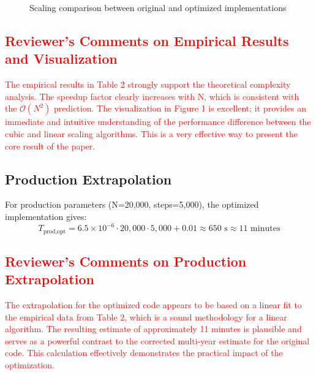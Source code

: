 \documentclass[11pt,a4paper]{article}
\newcommand{\bigO}{\mathcal{O}}
\begin{document}
\begin{figure}[H]
\centering
{}
\caption{Scaling comparison between original and optimized implementations}
\label{fig:scaling}
\end{figure}

\textcolor{red}{
\subsection*{Reviewer's Comments on Empirical Results and Visualization}
The empirical results in Table 2 strongly support the theoretical complexity analysis. The speedup factor clearly increases with N, which is consistent with the $\bigO(N^2)$ prediction. The visualization in Figure 1 is excellent; it provides an immediate and intuitive understanding of the performance difference between the cubic and linear scaling algorithms. This is a very effective way to present the core result of the paper.
}

\subsection{Production Extrapolation}

For production parameters (N=20,000, steps=5,000), the optimized implementation gives:
\begin{equation}
T_{\text{prod,opt}} = 6.5 \times 10^{-6} \cdot 20{,}000 \cdot 5{,}000 + 0.01 \approx 650 \text{ s} \approx 11 \text{ minutes}
\end{equation}

\textcolor{red}{
\subsection*{Reviewer's Comments on Production Extrapolation}
The extrapolation for the optimized code appears to be based on a linear fit to the empirical data from Table 2, which is a sound methodology for a linear algorithm. The resulting estimate of approximately 11 minutes is plausible and serves as a powerful contrast to the corrected multi-year estimate for the original code. This calculation effectively demonstrates the practical impact of the optimization.
}
\end{document}
